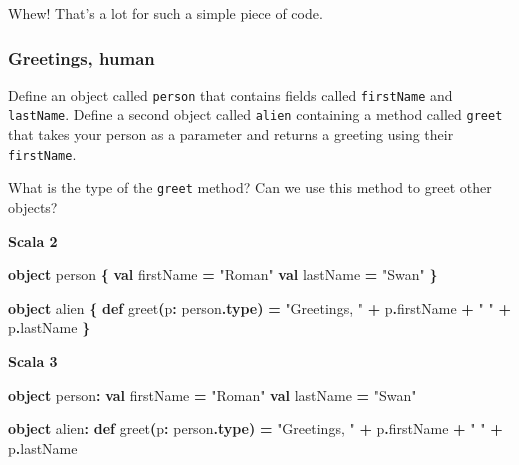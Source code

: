 \documentclass[11pt,a5paper,]{book}
\newenvironment{Shaded}{\begin{snugshade}}{\end{snugshade}}
\newcommand{\FunctionTok}[1]{\textcolor[rgb]{0.00,0.00,0.00}{#1}}
\newcommand{\KeywordTok}[1]{\textcolor[rgb]{0.13,0.29,0.53}{\textbf{#1}}}
\newcommand{\NormalTok}[1]{#1}
\newcommand{\OperatorTok}[1]{\textcolor[rgb]{0.81,0.36,0.00}{\textbf{#1}}}
\newcommand{\StringTok}[1]{\textcolor[rgb]{0.31,0.60,0.02}{#1}}
\begin{document}
Whew! That's a lot for such a simple piece of code.

\hypertarget{greetings-human}{%
\subsubsection{Greetings, human}\label{greetings-human}}

Define an object called \texttt{person} that contains fields called
\texttt{firstName} and \texttt{lastName}. Define a second object called
\texttt{alien} containing a method called \texttt{greet} that takes your
person as a parameter and returns a greeting using their
\texttt{firstName}.

What is the type of the \texttt{greet} method? Can we use this method to
greet other objects?

\textbf{Scala 2}

\begin{Shaded}
\begin{Highlighting}[]
\KeywordTok{object}\NormalTok{ person }\OperatorTok{\{}
  \KeywordTok{val}\NormalTok{ firstName }\OperatorTok{=} \StringTok{"Roman"}
  \KeywordTok{val}\NormalTok{ lastName }\OperatorTok{=} \StringTok{"Swan"}
\OperatorTok{\}}

\KeywordTok{object}\NormalTok{ alien }\OperatorTok{\{}
  \KeywordTok{def} \FunctionTok{greet}\OperatorTok{(}\NormalTok{p}\OperatorTok{:}\NormalTok{ person}\OperatorTok{.}\KeywordTok{type}\OperatorTok{)} \OperatorTok{=}
    \StringTok{"Greetings, "} \OperatorTok{+}\NormalTok{ p}\OperatorTok{.}\NormalTok{firstName }\OperatorTok{+} \StringTok{" "} \OperatorTok{+}\NormalTok{ p}\OperatorTok{.}\NormalTok{lastName}
\OperatorTok{\}}
\end{Highlighting}
\end{Shaded}

\textbf{Scala 3}

\begin{Shaded}
\begin{Highlighting}[]
\KeywordTok{object}\NormalTok{ person}\OperatorTok{:}
  \KeywordTok{val}\NormalTok{ firstName }\OperatorTok{=} \StringTok{"Roman"}
  \KeywordTok{val}\NormalTok{ lastName }\OperatorTok{=} \StringTok{"Swan"}

\KeywordTok{object}\NormalTok{ alien}\OperatorTok{:}
  \KeywordTok{def} \FunctionTok{greet}\OperatorTok{(}\NormalTok{p}\OperatorTok{:}\NormalTok{ person}\OperatorTok{.}\KeywordTok{type}\OperatorTok{)} \OperatorTok{=}
    \StringTok{"Greetings, "} \OperatorTok{+}\NormalTok{ p}\OperatorTok{.}\NormalTok{firstName }\OperatorTok{+} \StringTok{" "} \OperatorTok{+}\NormalTok{ p}\OperatorTok{.}\NormalTok{lastName}
\end{Highlighting}
\end{Shaded}
\end{document}
